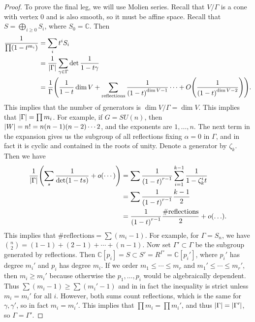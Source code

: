 \documentclass[leqno, openany]{memoir}
\theoremstyle{definition}
\theoremstyle{remark}
\theoremstyle{plain}
\theoremstyle{definition}
\theoremstyle{remark}
\newcommand{\C}{\mathbb{C}}
\begin{document}
\begin{proof}
    To prove the final leg, we will use Molien series. Recall that $V/{\Gamma}$ is a cone with vertex $0$ and is also smooth, so it must be affine space. Recall that $S = \bigoplus_{i \geq 0} S_i$, where $S_0 = \C$. Then
    \begin{align*}
        \frac{1}{\prod(1-t^{m_i})} &= \sum_i t^i S_i \\
                                   &= \frac{1}{\abs{\Gamma}} \sum_{\gamma \in \Gamma} \det \frac{1}{1- t \gamma} \\
                                   &= \frac{1}{\Gamma} \qty(\frac{1}{1-t} \dim V + \sum_{\text{reflections}} \frac{1}{{(1-t)}^{\dim V - 1}} \cdots + O\qty(\frac{1}{{(1-t)}^{\dim V - 2}})).
    \end{align*}
    This implies that the number of generators is $\dim V/\Gamma = \dim V$. This implies that $\abs{\Gamma} = \prod m_i$. For example, if $G = SU(n)$, then $\abs{W} = n! = n(n-1)(n-2) \cdots 2$, and the exponents are $1, \ldots, n$. The next term in the expansion gives us the subgroup of all reflections fixing $\alpha = 0$ in $\Gamma$, and in fact it is cyclic and contained in the roots of unity. Denote a generator by $\zeta_k$. Then we have
    \begin{align*} 
        \frac{1}{\abs{\Gamma}} \qty( \sum_s \frac{1}{\det(1-ts)} + o(\cdots) ) &= \sum \frac{1}{{(1-t)}^{r-1}} \sum_{i=1}^{k-1} \frac{1}{1-\zeta_k^i t} \\
                                                                               &= \sum \frac{1}{{(1-t)}^{r-1}} \frac{k-1}{2} \\
                                                                               &= \frac{1}{{(1-t)}^{r-1}} \frac{\# \text{reflections}}{2} + o(\ldots).
    \end{align*}
    This implies that $\# \text{reflections} = \sum (m_i - 1)$. For example, for $\Gamma = S_n$, we have $\binom{n}{2} = (1-1) + (2-1) + \cdots + (n-1)$. Now set $\Gamma' \subset \Gamma$ be the subgroup generated by reflections. Then $\C[p_i] = S \subset S' = R^{\Gamma'} = \C[p_i']$, where $p_i'$ has degree $m_i'$ and $p_i$ has degree $m_i$. If we order $m_1 \leq \cdots \leq m_r$ and $m_1' \leq \cdots \leq m_r'$, then $m_i \geq m_i'$ because otherwise the $p_1, \ldots, p_i$ would be algebraically dependent. Thus $\sum (m_i - 1) \geq \sum (m_i' - 1)$ and in in fact the inequality is strict unless $m_i = m_i'$ for all $i$. However, both sums count reflections, which is the same for $\gamma, \gamma'$, so in fact $m_i = m_i'$. This implies that $\prod m_i = \prod m_i'$, and thus $\abs{\Gamma} = \abs{\Gamma'}$, so $\Gamma = \Gamma'$.
\end{proof}
\end{document}

